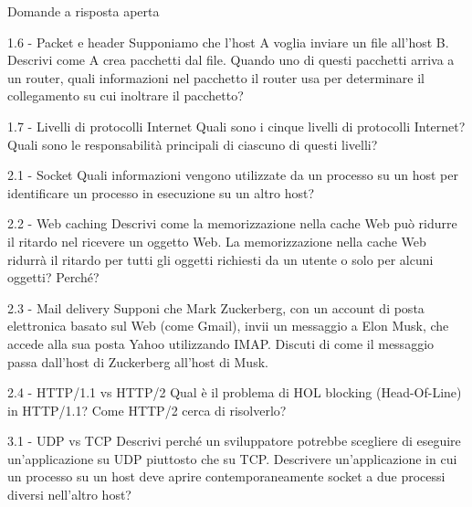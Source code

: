 \documentclass[a4paper]{article}
\begin{document}
\begin{quiz}{Domande a risposta aperta}
\begin{essay}[points=1]{1.6 - Packet e header}
Supponiamo che l'host A voglia inviare un file all'host B. Descrivi come A crea pacchetti dal file. Quando uno di questi pacchetti arriva a un router, quali informazioni nel pacchetto il router usa per determinare il collegamento su cui inoltrare il pacchetto?
\end{essay}

\begin{essay}[points=1]{1.7 - Livelli di protocolli Internet}
Quali sono i cinque livelli di protocolli Internet? Quali sono le responsabilità principali di ciascuno di questi livelli?
\end{essay}


\begin{essay}[points=1]{2.1 - Socket}
Quali informazioni vengono utilizzate da un processo su un host per identificare un processo in esecuzione su un altro host?
\end{essay}

\begin{essay}[points=1]{2.2 - Web caching}
Descrivi come la memorizzazione nella cache Web può ridurre il ritardo nel ricevere un oggetto Web. La memorizzazione nella cache Web ridurrà il ritardo per tutti gli oggetti richiesti da un utente o solo per alcuni oggetti? Perché?
\end{essay}

\begin{essay}[points=1]{2.3 - Mail delivery}
Supponi che Mark Zuckerberg, con un account di posta elettronica basato sul Web (come Gmail), invii un messaggio a Elon Musk, che accede alla sua posta Yahoo utilizzando IMAP. Discuti di come il messaggio passa dall'host di Zuckerberg all'host di Musk.
\end{essay}

\begin{essay}[points=1]{2.4 - HTTP/1.1 vs HTTP/2}
Qual è il problema di HOL blocking (Head-Of-Line) in HTTP/1.1? Come HTTP/2 cerca di risolverlo?
\end{essay}


\begin{essay}[points=1]{3.1 - UDP vs TCP}
Descrivi perché un sviluppatore potrebbe scegliere di eseguire un'applicazione su UDP piuttosto che su TCP. Descrivere un'applicazione in cui un processo su un host deve aprire contemporaneamente socket a due processi diversi nell'altro host?
\end{essay}


\end{quiz}
\end{document}
